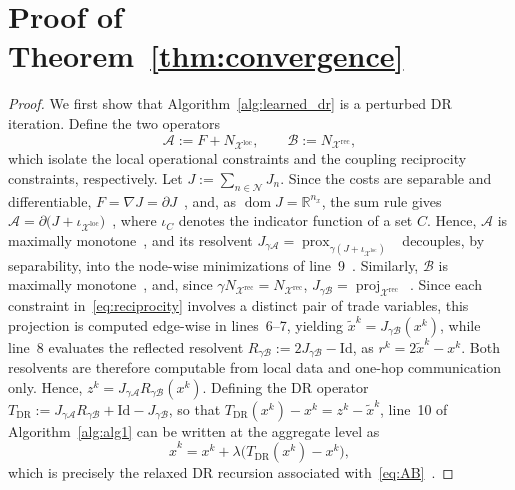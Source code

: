 \documentclass[final]{l4dc2026}
\begin{document}
\section{Proof of Theorem~\ref{thm:convergence}}
\label{app:proof}
\begin{proof}
We first show that Algorithm~\ref{alg:learned_dr} is a perturbed DR iteration. Define the two operators
\begin{equation}\label{eq:AB}
  \mathcal{A} := F + N_{\mathcal{X}^{\mathrm{loc}}},
  \qquad
  \mathcal{B} := N_{\mathcal{X}^{\mathrm{rec}}},
\end{equation}
which isolate the local operational constraints and the coupling reciprocity constraints, respectively. Let $J:=\sum_{n\in\mathcal N}J_n$. Since the costs are separable and differentiable, $F=\nabla J=\partial J$~\citep[Prop.~17.31(i)]{bauschke2017convex}, and, as $\operatorname{dom}J=\mathbb R^{n_x}$, the sum rule gives $\mathcal A=\partial\big(J+\iota_{\mathcal X^{\mathrm{loc}}}\big)$~\citep[Cor.~16.48(iii)]{bauschke2017convex}, where $\iota_C$ denotes the indicator function of a set $C$. Hence, $\mathcal A$ is maximally monotone~\citep[Thm.~20.25]{bauschke2017convex}, and its resolvent $J_{\gamma\mathcal A}=\operatorname{prox}_{\gamma(J+\iota_{\mathcal X^{\mathrm{loc}}})}$~\citep[Ex.~23.3]{bauschke2017convex} decouples, by separability, into the node-wise minimizations of line~9~\citep[Prop.~24.11 \& Def.~12.23]{bauschke2017convex}. Similarly, $\mathcal B$ is maximally monotone~\citep[Ex.~20.26]{bauschke2017convex}, and, since $\gamma N_{\mathcal X^{\mathrm{rec}}}=N_{\mathcal X^{\mathrm{rec}}}$, $J_{\gamma\mathcal B}=\operatorname{proj}_{\mathcal X^{\mathrm{rec}}}$~\citep[Ex.~23.4]{bauschke2017convex}. Since each constraint in~\eqref{eq:reciprocity} involves a distinct pair of trade variables, this projection is computed edge-wise in lines~6--7, yielding $\tilde x^k=J_{\gamma\mathcal B}(x^k)$, while line~8 evaluates the reflected resolvent $R_{\gamma\mathcal B}:=2J_{\gamma\mathcal B}-\mathrm{Id}$, as $r^k=2\tilde x^k-x^k$. Both resolvents are therefore computable from local data and one-hop communication only. Hence, $z^k=J_{\gamma\mathcal A}R_{\gamma\mathcal B}(x^k)$. Defining the DR operator $T_{\mathrm{DR}}:=J_{\gamma\mathcal A}R_{\gamma\mathcal B}+\mathrm{Id}-J_{\gamma\mathcal B}$, so that $T_{\mathrm{DR}}(x^k)-x^k=z^k-\tilde x^k$, line~10 of Algorithm~\ref{alg:alg1} can be written at the aggregate level as
\begin{equation}
    \hat x^{k}
    =
    x^k
    +
    \lambda
    \big(
        T_{\mathrm{DR}}(x^k)-x^k
    \big),
    \label{eq:baseline-dr-update}
\end{equation}
which is precisely the relaxed DR recursion associated with~\eqref{eq:AB}~\citep[Thm.~26.11]{bauschke2017convex}.


\end{proof}
\end{document}
